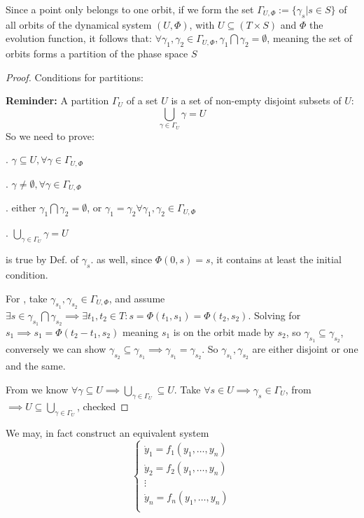 Since a point only belongs to one orbit, if we form the set
$\Gamma_{U,\Phi}:=\{ \gamma_s | s \in S \}$
of all orbits of the dynamical system $(U,\Phi)$, with $U\subseteq (T \times S)$ and $\Phi$ the evolution function, it follows that:
$\forall \gamma_1,\gamma_2 \in \Gamma_{U, \Phi}, \gamma_1 \bigcap \gamma_2 = \emptyset$, meaning the set of orbits forms a partition of the phase space $S$

\begin{proof}
	Conditions for partitions:
	\par \textbf{Reminder:} A partition $\Gamma_U$ of a set $U$ is a set of non-empty disjoint subsets of $U$:
	\[
		\bigcup_{\gamma\in \Gamma_U} \gamma = U
	\]
	So we need to prove:

	. $\gamma \subseteq U, \forall \gamma \in \Gamma_{U,\Phi}$ \par
	. $ \gamma \neq \emptyset, \forall \gamma \in \Gamma_{U,\Phi}$ \par
	. either $\gamma_1 \bigcap \gamma_2 = \emptyset$, or $ \gamma_1 = \gamma_2 \forall \gamma_1, \gamma_2 \in \Gamma_{U,\Phi}$ \par
	. $\bigcup_{\gamma\in \Gamma_U} \gamma = U$ \par

	 is true by Def. of $\gamma_s$.  as well, since $\Phi(0,s) = s$, it contains at least the initial condition.

	For , take $\gamma_{s_1}, \gamma_{s_2} \in \Gamma_{U, \Phi}$, and assume $\exists s \in \gamma_{s_1} \bigcap \gamma_{s_2} \implies \exists t_1,t_2 \in T : s = \Phi(t_1,s_1) = \Phi(t_2, s_2)$. Solving for $s_1 \implies s_1 = \Phi(t_2-t_1, s_2)$ meaning $s_1$ is on the orbit made by $s_2$, so $\gamma_{s_1} \subseteq \gamma_{s_2}$, conversely we can show $\gamma_{s_2} \subseteq \gamma_{s_1} \implies \gamma_{s_1} = \gamma_{s_2}$. So $\gamma_{s_1}, \gamma_{s_2}$ are either disjoint or one and the same.

	From  we know $\forall \gamma \subseteq U \implies \bigcup_{\gamma\in \Gamma_U} \subseteq U$. Take $\forall s \in U \implies \gamma_s \in \Gamma_U$, from  $\implies U \subseteq \bigcup_{\gamma\in \Gamma_U}$,  checked
\end{proof}

We may, in fact construct an equivalent system
\[
	\begin{cases}
		\dot{y}_1 = f_1(y_1,\dots, y_n) \\
		\dot{y}_2 = f_2(y_1,\dots, y_n) \\
		\vdots                          \\
		\dot{y}_n = f_n(y_1,\dots, y_n) \\
	\end{cases}
\]

